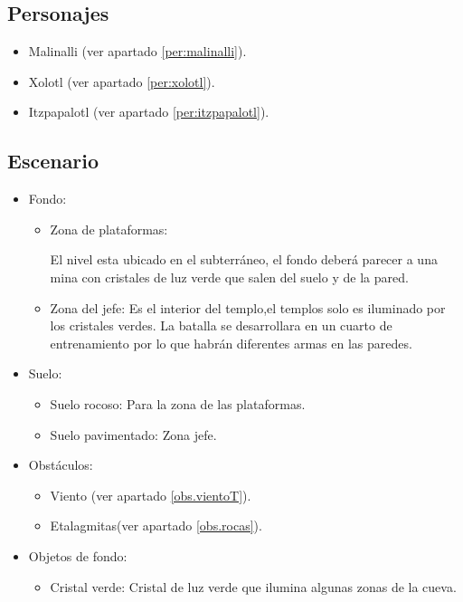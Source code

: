        \subsection{Personajes}
        \begin{itemize}
                \item Malinalli (ver apartado \ref{per:malinalli}).
            
                \item Xolotl (ver apartado \ref{per:xolotl}).
                
                \item Itzpapalotl (ver apartado \ref{per:itzpapalotl}).
               
        \end{itemize}
\subsection{Escenario}
\begin{itemize} 
        \item Fondo:
                \begin{itemize}
                        \item Zona de plataformas:
\\
\par
El nivel esta ubicado en el subterráneo, el fondo deberá parecer a una mina con cristales de luz verde que salen del suelo y de la pared.
                        \item Zona del jefe:
Es el interior del templo,el templos solo es iluminado por los cristales verdes. La batalla se desarrollara en un cuarto de entrenamiento por lo que habrán diferentes armas en las paredes.
                \end{itemize}
        \item Suelo:
                \begin{itemize}
                        \item Suelo rocoso: Para la zona de las plataformas.
                        \item Suelo pavimentado: Zona jefe.
                \end{itemize}
	  \item Obstáculos:
                \begin{itemize}
                        \item Viento (ver apartado \ref{obs.vientoT}).
                        \item Etalagmitas(ver apartado \ref{obs.rocas}).
                \end{itemize}
        \item Objetos de fondo:
                \begin{itemize}
                        \item Cristal verde: Cristal de luz verde que ilumina algunas zonas de la cueva.
                \end{itemize}
\end{itemize}   

